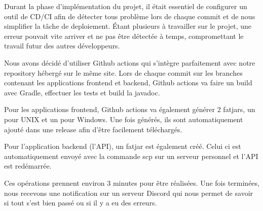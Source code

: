 \documentclass[../rapport.tex]{subfiles}
\begin{document}
Durant la phase d'implémentation du projet, il était essentiel de configurer un outil de CD/CI afin de détecter tous problème lors de chaque commit et de nous simplifier la tâche de deploiement.
Étant plusieurs à travailler sur le projet, une erreur pouvait vite arriver et ne pas être détectée à temps, compromettant le travail futur des autres développeurs. 

Nous avons décidé d'utiliser Github actions qui s'intègre parfaitement avec notre repository hébergé sur le même site.
Lors de chaque commit sur les branches contenant les applications frontend et backend, Github actions va faire un build avec Gradle, effectuer les tests et build la javadoc. 

Pour les applications frontend, Github actions va également générer 2 fatjars, un pour UNIX et un pour Windows.
Une fois générés, ils sont automatiquement ajouté dans une release afin d'être facilement téléchargés.

Pour l'application backend (l'API), un fatjar est également créé.
Celui ci est automatiquement envoyé avec la commande scp sur un serveur personnel et l'API est redémarrée.

Ces opérations prennent environ 3 minutes pour être réalisées.
Une fois terminées, nous recevons une notification sur un serveur Discord qui nous permet de savoir si tout s'est bien passé ou si il y a eu des erreurs.
\newpage
\end{document}
